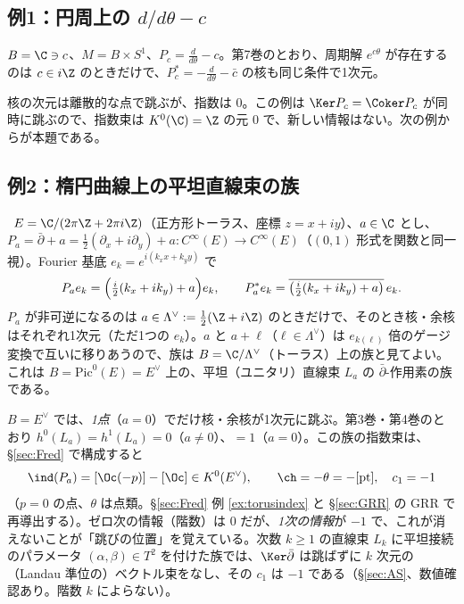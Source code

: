 \subsection{例1：円周上の $d/d\theta-c$}
$B=\C\ni c$、$M=B\times S^1$、$P_c=\frac d{d\theta}-c$。第7巻のとおり、周期解 $e^{c\theta}$ が存在するのは $c\in i\Z$ のときだけで、$P_c^*=-\frac d{d\theta}-\bar c$ の核も同じ条件で1次元。
\begin{center}
\end{center}
核の次元は離散的な点で跳ぶが、指数は $0$。この例は $\Ker P_c=\Coker P_c$ が同時に跳ぶので、指数束は $K^0(\C)=\Z$ の元 $0$ で、新しい情報はない。次の例からが本題である。

\subsection{例2：楕円曲線上の平坦直線束の族}
\begin{ex}\label{ex:torusfam}\tP\
$E=\C/(2\pi\Z+2\pi i\Z)$（正方形トーラス、座標 $z=x+iy$）、$a\in\C$ とし、$P_a=\bar\partial+a=\frac12(\partial_x+i\partial_y)+a:C^\infty(E)\to C^\infty(E)$（$(0,1)$ 形式を関数と同一視）。Fourier 基底 $e_k=e^{i(k_xx+k_yy)}$ で
\[
P_ae_k=\Bigl(\tfrac i2(k_x+ik_y)+a\Bigr)e_k,\qquad P_a^*e_k=\overline{\bigl(\tfrac i2(k_x+ik_y)+a\bigr)}\,e_k.
\]
$P_a$ が非可逆になるのは $a\in\Lambda^\vee:=\tfrac12(\Z+i\Z)$ のときだけで、そのとき核・余核はそれぞれ1次元（ただ1つの $e_k$）。$a$ と $a+\ell$（$\ell\in\Lambda^\vee$）は $e_{k(\ell)}$ 倍のゲージ変換で互いに移りあうので、族は $B=\C/\Lambda^\vee$（トーラス）上の族と見てよい。これは $B=\mathrm{Pic}^0(E)=E^\vee$ 上の、平坦（ユニタリ）直線束 $L_a$ の $\bar\partial$-作用素の族である。
\end{ex}
$B=E^\vee$ では、\emph{1点}（$a=0$）でだけ核・余核が1次元に跳ぶ。第3巻・第4巻のとおり $h^0(L_a)=h^1(L_a)=0$（$a\ne0$）、$=1$（$a=0$）。この族の指数束は、\S\ref{sec:Fred} で構成すると
\[
\ind(P_a)=[\Oc(-p)]-[\Oc]\in K^0(E^\vee),\qquad \ch=-\theta=-[\mathrm{pt}],\quad c_1=-1
\]
（$p=0$ の点、$\theta$ は点類。\S\ref{sec:Fred} 例 \ref{ex:torusindex} と \S\ref{sec:GRR} の GRR で再導出する）。ゼロ次の情報（階数）は $0$ だが、\emph{1次の情報}が $-1$ で、これが消えないことが「跳びの位置」を覚えている。次数 $k\ge1$ の直線束 $L_k$ に平坦接続のパラメータ $(\alpha,\beta)\in T^2$ を付けた族では、$\Ker\bar\partial$ は跳ばずに $k$ 次元の（Landau 準位の）ベクトル束をなし、その $c_1$ は $-1$ である（\S\ref{sec:AS}、数値確認あり。階数 $k$ によらない）。

